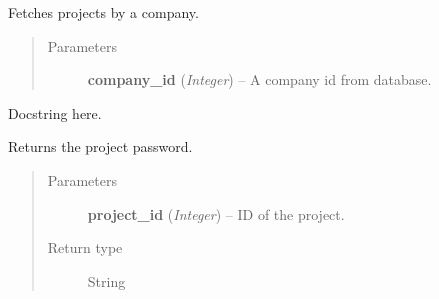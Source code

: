 \documentclass[letterpaper,10pt,english]{sphinxmanual}
\begin{document}

\begin{fulllineitems}
\label{controller:controller.project.get_project}
Fetches projects by a company.
\begin{quote}\begin{description}
\item[{Parameters}] \leavevmode
\textbf{company\_id} (\emph{Integer}) -- A company id from database.

\end{description}\end{quote}

\end{fulllineitems}


\begin{fulllineitems}
\label{controller:controller.project.get_project_id_by_activity}
Docstring here.

\end{fulllineitems}


\begin{fulllineitems}
\label{controller:controller.project.get_project_password}
Returns the project password.
\begin{quote}\begin{description}
\item[{Parameters}] \leavevmode
\textbf{project\_id} (\emph{Integer}) -- ID of the project.

\item[{Return type}] \leavevmode
String

\end{description}\end{quote}

\end{fulllineitems}

\end{document}
